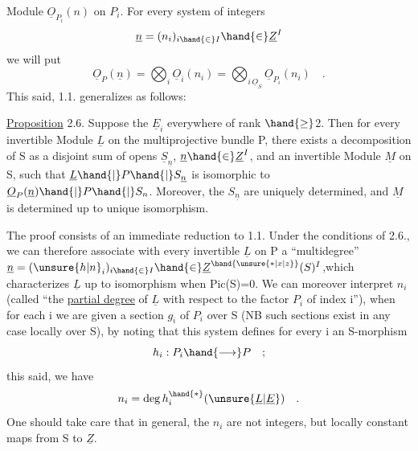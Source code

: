 
 Module $\underline{O}_{P_i}(n)$ on $P_i$. For every system of integers
\[ \underline{n} = (n_i)_{i \hand{\in} I} \hand{\in} \underline{Z}^I \]
we  will put
\[ \underline{O}_P(\underline{n}) = \bigotimes_i \underline{O}_i(n_i) = \bigotimes_{i\,\underline{O}_S} \underline{O}_{P_i}(n_i) \quad . \]
This said, 1.1. generalizes as follows:

\uline{Proposition} 2.6. Suppose the $\underline{E}_i$ everywhere of rank $\hand{\geq}$2. Then for every
invertible Module $\underline{L}$ on the multiprojective bundle P, there exists a
 decomposition of S as a disjoint sum of opens $\underline{S}_{\underline{n}}$, $\underline{n} \hand{\in} \underline{Z}^I$,
and  an invertible Module $\underline{M}$ on S, such that $\underline{L}\hand{|}P\hand{|}S_{\underline{n}}$
is isomorphic to $\underline{O}_P(\underline{n})\hand{|}P\hand{|}S_n$. Moreover, the $S_{\underline{n}}$ are uniquely
determined, and  $\underline{M}$ is determined up to unique isomorphism.

 The proof  consists of an immediate reduction to 1.1.
Under the conditions of 2.6., we can therefore associate with every invertible $\underline{L}$
on P a ``multidegree'' $\underline{n} = (\unsure{h|n}_i)_{i \hand{\in} I} \hand{\in} \underline{Z}^{\hand{\unsure{*|x|z}}}(S)^I$,which characterizes $\underline{L}$ up to isomorphism
when Pic(S)=0. We can moreover interpret $n_i$ (called
``the \uline{partial degree} of $\underline{L}$ with respect to the factor $P_i$ of index i''), when
for each i we are given a section $g_i$ of $P_i$ over S (NB such sections
exist in any case locally over S), by noting that this system defines
for every i an S-morphism 
\[ h_i : P_i \hand{\longrightarrow} P \quad ; \]
this said, we have
\[ n_i = \deg h_i^{\hand{*}}(\unsure{\underline{L}|\underline{E}}) \quad . \]
One should take care that in general, the $n_i$ are not integers, but locally constant
maps from S to $\underline{Z}$.

